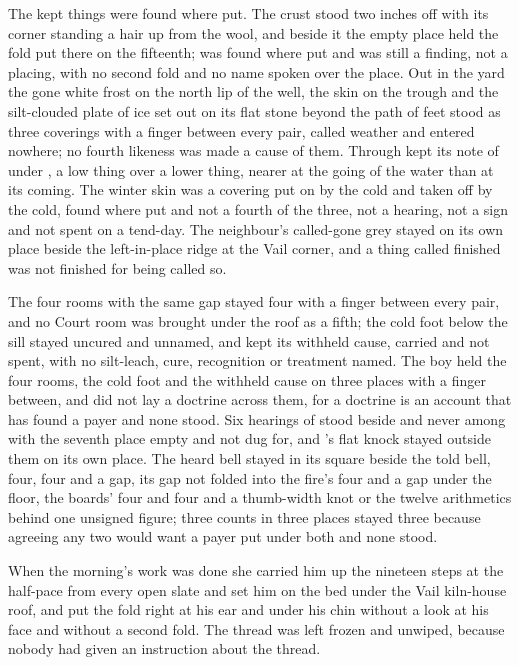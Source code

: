 The kept things were found where put. The crust stood two inches off with its corner standing a hair up from the wool, and beside it the empty place held the fold put there on the fifteenth;  was found where put and was still a finding, not a placing, with no second fold and no name spoken over the place. Out in the yard the gone white frost on the north lip of the well, the skin on the trough and the silt-clouded plate of ice set out on its flat stone beyond the path of feet stood as three coverings with a finger between every pair, called weather and entered nowhere; no fourth likeness was made a cause of them. Through   kept its note of  under , a low thing over a lower thing, nearer at the going of the water than at its coming. The winter skin was a covering put on by the cold and taken off by the cold, found where put and not a fourth of the three, not a hearing, not a sign and not spent on a tend-day. The neighbour's called-gone grey stayed on its own place beside the left-in-place ridge at the Vail corner, and a thing called finished was not finished for being called so.

The four rooms with the same gap stayed four with a finger between every pair, and no Court room was brought under the roof as a fifth; the cold foot below the sill stayed uncured and unnamed, and  kept its withheld cause, carried and not spent, with no silt-leach, cure, recognition or treatment named. The boy held the four rooms, the cold foot and the withheld cause on three places with a finger between, and did not lay a doctrine across them, for a doctrine is an account that has found a payer and none stood. Six hearings of  stood beside and never among with the seventh place empty and not dug for, and 's flat knock stayed outside them on its own place. The heard bell stayed in its square beside the told bell, four, four and a gap, its gap not folded into the fire's four and a gap under the floor, the boards' four and four and a thumb-width knot or the twelve arithmetics behind one unsigned figure; three counts in three places stayed three because agreeing any two would want a payer put under both and none stood.

When the morning's work was done she carried him up the nineteen steps at the half-pace from every open slate and set him on the bed under the Vail kiln-house roof, and put the fold right at his ear and under his chin without a look at his face and without a second fold. The thread was left frozen and unwiped, because nobody had given an instruction about the thread.

